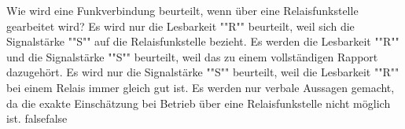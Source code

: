     {Wie wird eine Funkverbindung beurteilt, wenn über eine Relaisfunkstelle gearbeitet wird?}
    {Es wird nur die Lesbarkeit ""R"" beurteilt, weil sich die Signalstärke ""S"" auf die Relaisfunkstelle bezieht.}
    {Es werden die Lesbarkeit ""R"" und die Signalstärke  ""S"" beurteilt, weil das zu einem vollständigen Rapport dazugehört.}
    {Es wird nur die Signalstärke  ""S"" beurteilt, weil die Lesbarkeit ""R"" bei einem Relais immer gleich gut ist.}
    {Es werden nur verbale Aussagen gemacht, da die exakte Einschätzung bei Betrieb über eine Relaisfunkstelle nicht möglich ist.}
    {false}{false}